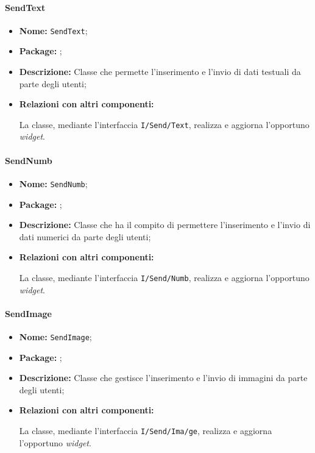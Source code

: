 \paragraph{SendText}
\begin{flushleft}
\begin{itemize}
\item \textbf{Nome:} \texttt{SendText};
\item \textbf{Package:} \texttt{\logicUser};
\item \textbf{Descrizione:} Classe che permette l'inserimento e l'invio di dati testuali da parte degli utenti;
\item \textbf{Relazioni con altri componenti:}
\begin{sloppypar}
La classe, mediante l'interfaccia \texttt{\logicUser{}I\fshyp{}Send\fshyp{}Text}, realizza e aggiorna l'opportuno \textit{widget}.
\end{sloppypar}
\end{itemize}
\end{flushleft}

\paragraph{SendNumb}
\begin{flushleft}
\begin{itemize}
\item \textbf{Nome:} \texttt{SendNumb};
\item \textbf{Package:} \texttt{\logicUser};
\item \textbf{Descrizione:} Classe che ha il compito di permettere l'inserimento e l'invio di dati numerici da parte degli utenti;
\item \textbf{Relazioni con altri componenti:}
\begin{sloppypar}
La classe, mediante l'interfaccia \texttt{\logicUser{}I\fshyp{}Send\fshyp{}Numb}, realizza e aggiorna l'opportuno \textit{widget}.
\end{sloppypar}
\end{itemize}
\end{flushleft}

\paragraph{SendImage}
\begin{flushleft}
\begin{itemize}
\item \textbf{Nome:} \texttt{SendImage};
\item \textbf{Package:} \texttt{\logicUser};
\item \textbf{Descrizione:} Classe che gestisce l'inserimento e l'invio di immagini da parte degli utenti;
\item \textbf{Relazioni con altri componenti:}
\begin{sloppypar}
La classe, mediante l'interfaccia \texttt{\logicUser{}I\fshyp{}Send\fshyp{}Ima\fshyp{}ge}, realizza e aggiorna l'opportuno \textit{widget}.
\end{sloppypar}
\end{itemize}
\end{flushleft}

